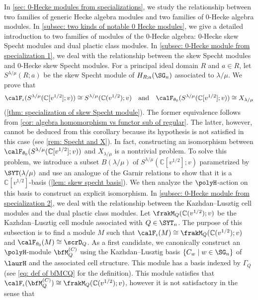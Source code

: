 \documentclass[12pt, reqno]{amsart}
\theoremstyle{plain}
\theoremstyle{definition}
\numberwithin{equation}{section}
\numberwithin{figure}{section}
\numberwithin{table}{section}
\def\C{\mathbb C}
\begin{document}
In \cref{sec: 0-Hecke modules from specializations}, we study the relationship between two families of generic Hecke algebra modules and two  families of $0$-Hecke algebra modules.
In \cref{subsec: two kinds of notable 0 Hecke modules}, we give a detailed introduction to two families of modules of the $0$-Hecke algebra: $0$-Hecke skew Specht modules and dual plactic class modules.
In \cref{subsec: 0-Hecke module from specialization 1}, we deal with the relationship between the skew Specht modules  and $0$-Hecke skew Specht modules.
For a principal ideal domain $R$ and $a \in R$, let  $S^{\lambda/\mu}(R;a)$ be the skew Specht module of $H_{R;a}(\SG_n)$ associated to $\lambda/\mu$.
We prove that 
\begin{align*}
\calF_{\iota}(S^{\lambda / \mu}(\C[v^{1/2}] ;v)) 
\cong S^{\lambda / \mu}(\C(v^{1/2}); v)
\quad \text{and} \quad
\calF_{\theta_0}(S^{\lambda / \mu}(\C[v^{1/2}] ;v))
\cong X_{\lambda/\mu}
\end{align*}
(\cref{thm: specialization of skew Specht module}).
The former equivalence follows  from \cref{cor: algebra homomorphism vs functor sub of regular}. 
The latter, however, cannot be deduced from this corollary because its hypothesis is not satisfied in this case (see \cref{rem: Specht and X}).
In fact, constructing an isomorphism between $\calF_{\theta_0}(S^{\lambda/\mu}(\C[v^{1/2}];v))$ and $X_{\lambda/\mu}$ is a nontrivial problem.
To solve this problem,  we introduce a subset $B(\lambda/\mu)$ of $S^{\lambda/\mu}(\C[v^{1/2}];v)$ parametrized by $\SYT(\lambda/\mu)$ and use an analogue of the Garnir relations to show that it is a $\C[v^{1/2}]$-basis (\cref{lem: skew specht basis}). 
We then analyze the $\polyH$-action on this basis to construct an explicit isomorphism.
In \cref{subsec: 0-Hecke module from specialization 2}, we deal with the relationship between the Kazhdan--Lusztig cell modules and the dual plactic class modules.
Let  $\frakM_Q(\C(v^{1/2});v)$ be the Kazhdan--Lusztig cell module associated with $Q \in \SYT_n$.
The purpose of this subsection is to find a module $M$ such that $\calF_\iota(M) \cong \frakM_Q(\C(v^{1/2});v)$ and $\calF_{\theta_0}(M) \cong \scrD_Q$.
As a first candidate, we canonically construct an $\polyH$-module $\bfM_Q^{(C)}$ using the Kazhdan--Lusztig basis $\{C_w \mid w \in \SG_n\}$ of $\laurH$ and the associated cell structure.
This module has a basis indexed by $\Gamma_Q$ (see \cref{eq: def of bfMCQ} for the definition).
This module satisfies that
 $\calF_{\iota}(\bfM^{(C)}_Q)
\cong \frakM_Q(\C(v^{1/2});v)$, however it is not satisfactory in the sense that  
\end{document}
